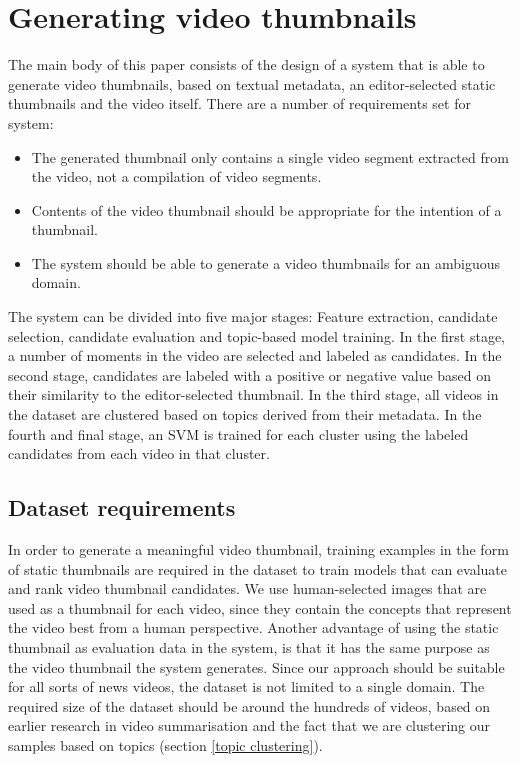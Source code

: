 \documentclass{../resources/sig-alternate-05-2015}
\begin{document}
\section{Generating video thumbnails}
\label{section: system description}
The main body of this paper consists of the design of a system that is able to generate video thumbnails, based on textual metadata, an editor-selected static thumbnails and the video itself. There are a number of requirements set for system:

\begin{itemize}
	\item The generated thumbnail only contains a single video segment extracted from the video, not a compilation of video segments.
	\item Contents of the video thumbnail should be appropriate for the intention of a thumbnail.
	\item The system should be able to generate a video thumbnails for an ambiguous domain.
\end{itemize}

The system can be divided into five major stages: Feature extraction, candidate selection, candidate evaluation and topic-based model training. In the first stage, a number of moments in the video are selected and labeled as candidates. In the second stage, candidates are labeled with a positive or negative value based on their similarity to the editor-selected thumbnail. In the third stage, all videos in the dataset are clustered based on topics derived from their metadata. In the fourth and final stage, an SVM is trained for each cluster using the labeled candidates from each video in that cluster.

\subsection{Dataset requirements}
\label{section: dataset requirements}
In order to generate a meaningful video thumbnail, training examples in the form of static thumbnails are required in the dataset to train models that can evaluate and rank video thumbnail candidates. We use human-selected images that are used as a thumbnail for each video, since they contain the concepts that represent the video best from a human perspective. Another advantage of using the static thumbnail as evaluation data in the system, is that it has the same purpose as the video thumbnail the system generates. Since our approach should be suitable for all sorts of news videos, the dataset is not limited to a single domain. The required size of the dataset should be around the hundreds of videos, based on earlier research in video summarisation \cite{Almeida:2012be,Christel:2004in,Money:2008fn} and the fact that we are clustering our samples based on topics (section \ref{topic clustering}).
\end{document}
